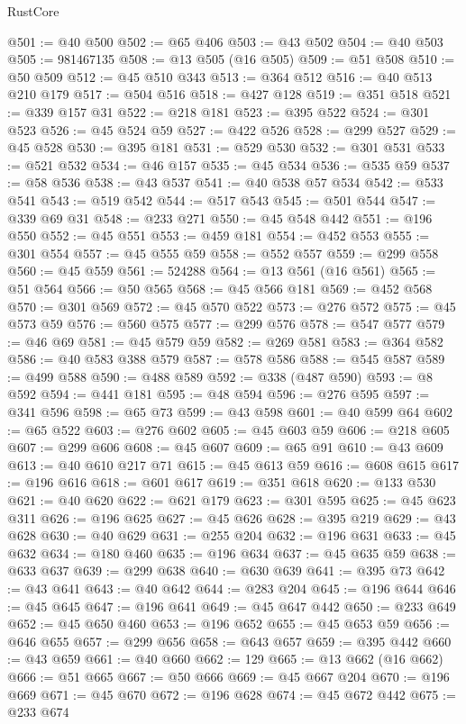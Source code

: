 \begin{lexlean}{RustCore}
\begin{coremodule}
@501 := @40 @500
@502 := @65 @406
@503 := @43 @502
@504 := @40 @503
@505 := 981467135
@508 := @13 @505 (@16 @505)
@509 := @51 @508
@510 := @50 @509
@512 := @45 @510 @343
@513 := @364 @512
@516 := @40 @513 @210 @179
@517 := @504 @516
@518 := @427 @128
@519 := @351 @518
@521 := @339 @157 @31
@522 := @218 @181
@523 := @395 @522
@524 := @301 @523
@526 := @45 @524 @59
@527 := @422 @526
@528 := @299 @527
@529 := @45 @528
@530 := @395 @181
@531 := @529 @530
@532 := @301 @531
@533 := @521 @532
@534 := @46 @157
@535 := @45 @534
@536 := @535 @59
@537 := @58 @536
@538 := @43 @537
@541 := @40 @538 @57 @534
@542 := @533 @541
@543 := @519 @542
@544 := @517 @543
@545 := @501 @544
@547 := @339 @69 @31
@548 := @233 @271
@550 := @45 @548 @442
@551 := @196 @550
@552 := @45 @551
@553 := @459 @181
@554 := @452 @553
@555 := @301 @554
@557 := @45 @555 @59
@558 := @552 @557
@559 := @299 @558
@560 := @45 @559
@561 := 524288
@564 := @13 @561 (@16 @561)
@565 := @51 @564
@566 := @50 @565
@568 := @45 @566 @181
@569 := @452 @568
@570 := @301 @569
@572 := @45 @570 @522
@573 := @276 @572
@575 := @45 @573 @59
@576 := @560 @575
@577 := @299 @576
@578 := @547 @577
@579 := @46 @69
@581 := @45 @579 @59
@582 := @269 @581
@583 := @364 @582
@586 := @40 @583 @388 @579
@587 := @578 @586
@588 := @545 @587
@589 := @499 @588
@590 := @488 @589
@592 := @338 (@487 @590)
@593 := @8 @592
@594 := @441 @181
@595 := @48 @594
@596 := @276 @595
@597 := @341 @596
@598 := @65 @73
@599 := @43 @598
@601 := @40 @599 @64
@602 := @65 @522
@603 := @276 @602
@605 := @45 @603 @59
@606 := @218 @605
@607 := @299 @606
@608 := @45 @607
@609 := @65 @91
@610 := @43 @609
@613 := @40 @610 @217 @71
@615 := @45 @613 @59
@616 := @608 @615
@617 := @196 @616
@618 := @601 @617
@619 := @351 @618
@620 := @133 @530
@621 := @40 @620
@622 := @621 @179
@623 := @301 @595
@625 := @45 @623 @311
@626 := @196 @625
@627 := @45 @626
@628 := @395 @219
@629 := @43 @628
@630 := @40 @629
@631 := @255 @204
@632 := @196 @631
@633 := @45 @632
@634 := @180 @460
@635 := @196 @634
@637 := @45 @635 @59
@638 := @633 @637
@639 := @299 @638
@640 := @630 @639
@641 := @395 @73
@642 := @43 @641
@643 := @40 @642
@644 := @283 @204
@645 := @196 @644
@646 := @45 @645
@647 := @196 @641
@649 := @45 @647 @442
@650 := @233 @649
@652 := @45 @650 @460
@653 := @196 @652
@655 := @45 @653 @59
@656 := @646 @655
@657 := @299 @656
@658 := @643 @657
@659 := @395 @442
@660 := @43 @659
@661 := @40 @660
@662 := 129
@665 := @13 @662 (@16 @662)
@666 := @51 @665
@667 := @50 @666
@669 := @45 @667 @204
@670 := @196 @669
@671 := @45 @670
@672 := @196 @628
@674 := @45 @672 @442
@675 := @233 @674

\end{coremodule}
\end{lexlean}
